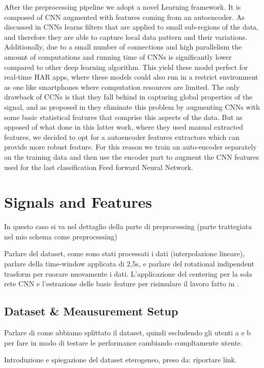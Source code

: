 After the preprocessing pipeline we adopt a novel Learning framework. It is composed of CNN augmented with features coming from an autoencoder. As discussed in \cite{ignatov2018real} CNNs learns filters that are applied to small sub-regions of the data, and therefore they are able to capture local data pattern and their variations. Additionally, due to a small number of connections and high parallelism the amount of computations and running time of CNNs is significantly lower compared to other deep learning algorithm. This yield these model perfect for real-time HAR apps, where these models could also run in a restrict environment as one like smartphones where computation resources are limited. The only drawback of CCNs is that they fall behind in capturing global properties of the signal, and as proposed in \cite{ignatov2018real} they eliminate this problem by augmenting CNNs with some basic statistical features that comprise this aspects of the data. But as opposed of what done in this latter work, where they used manual extracted features, we decided to opt for a autoencoder features extractors which can provide more robust feature. For this reason we train an auto-encoder separately on the training data and then use the encoder part to augment the CNN features used for the last classification Feed forward Neural Network. 

\section{Signals and Features}
\label{sec:model}

In questo caso si va nel dettaglio della parte di preprocessing (parte trattegiata nel mio schema come preprocessing)

Parlare del dataset, come sono stati processati i dati (interpolazione lineare), parlare della time-window applicata di 2,5s, e parlare del rotational indipendent trasform per ruorare nuovamente i dati. L'applicazione del centering per la sola rete CNN e l'estrazione delle basic feature per risimulare il lavoro fatto in \cite{ignatov2018real}.

\subsection{Dataset \& Meausurement Setup}
Parlare di come abbiamo splittato il dataset, quindi escludendo gli utenti a e b per fare in modo di testare le performance cambiando compltamente utente.

Introduzione e spiegazione del dataset eterogeneo, preso da: riportare link.

